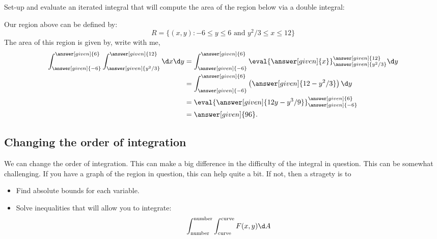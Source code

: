 \documentclass{ximera}
\begin{document}
\begin{example}
  Set-up and evaluate an iterated integral that will compute the area
  of the region below via a double integral:
  \begin{image}
  \end{image}
  \begin{explanation}
    Our region above can be defined by:
    \[
    R=\{(x,y):\text{$-6\leq y\leq 6$ and $y^2/3\leq x\leq 12$}\}
    \]
    The area of this region is given by, write with me, 
    \begin{align*}
      \int_{\answer[given]{-6}}^{\answer[given]{6}}\int_{\answer[given]{y^2/3}}^{\answer[given]{12}}\d x \d y &= \int_{\answer[given]{-6}}^{\answer[given]{6}} \eval{\answer[given]{x}}_{\answer[given]{y^2/3}}^{\answer[given]{12}} \d y\\
      &=  \int_{\answer[given]{-6}}^{\answer[given]{6}} \left(\answer[given]{12-y^2/3}\right) \d y\\
      &=  \eval{\answer[given]{12y-y^3/9}}_{\answer[given]{-6}}^{\answer[given]{6}}\\
      &= \answer[given]{96}. 
    \end{align*}
  \end{explanation}
\end{example}

\subsection{Changing the order of integration}

We can change the order of integration. This can make a big difference
in the difficulty of the integral in question. This can be somewhat
challenging. If you have a graph of the region in question, this can
help quite a bit. If not, then a stragety is to
\begin{itemize}
\item Find absolute bounds for each variable.
\item Solve inequalities that will allow you to integrate:
  \[
  \int_{\text{number}}^{\text{number}}\int_{\text{curve}}^{\text{curve}} F(x,y) \d A
  \]
\end{itemize}
\end{document}
